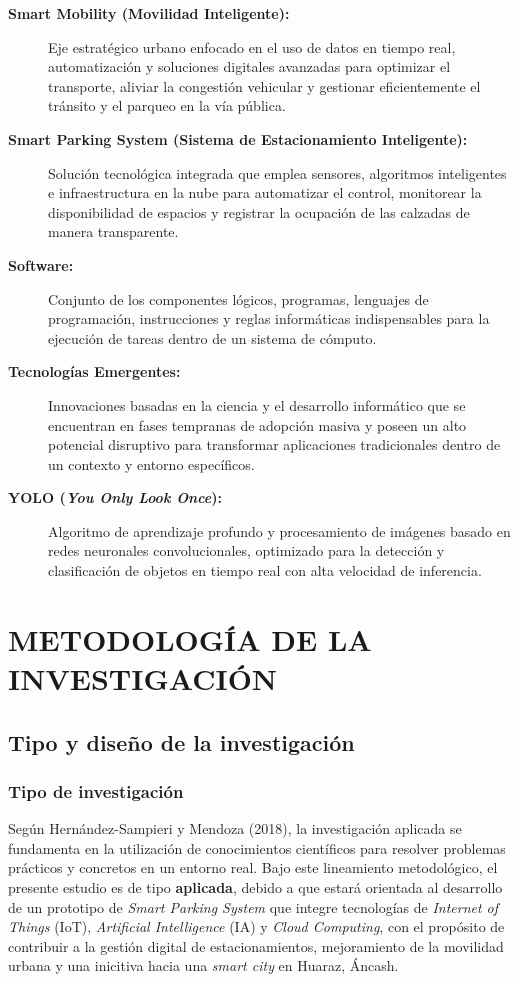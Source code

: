 \documentclass[12pt,a4paper]{article}
\begin{document}
\begin{description}
	\item[\textbf{Smart Mobility (Movilidad Inteligente):}] Eje estratégico urbano enfocado en el uso de datos en tiempo real, automatización y soluciones digitales avanzadas para optimizar el transporte, aliviar la congestión vehicular y gestionar eficientemente el tránsito y el parqueo en la vía pública.
	
	\item[\textbf{Smart Parking System (Sistema de Estacionamiento Inteligente):}] Solución tecnológica integrada que emplea sensores, algoritmos inteligentes e infraestructura en la nube para automatizar el control, monitorear la disponibilidad de espacios y registrar la ocupación de las calzadas de manera transparente.
	
	\item[\textbf{Software:}] Conjunto de los componentes lógicos, programas, lenguajes de programación, instrucciones y reglas informáticas indispensables para la ejecución de tareas dentro de un sistema de cómputo.
	
	\item[\textbf{Tecnologías Emergentes:}] Innovaciones basadas en la ciencia y el desarrollo informático que se encuentran en fases tempranas de adopción masiva y poseen un alto potencial disruptivo para transformar aplicaciones tradicionales dentro de un contexto y entorno específicos.
	
	\item[\textbf{YOLO (\textit{You Only Look Once}):}] Algoritmo de aprendizaje profundo y procesamiento de imágenes basado en redes neuronales convolucionales, optimizado para la detección y clasificación de objetos en tiempo real con alta velocidad de inferencia.
\end{description}


\clearpage
\section{METODOLOGÍA DE LA INVESTIGACIÓN}

\subsection{Tipo y diseño de la investigación}

\subsubsection{Tipo de investigación}
Según Hernández-Sampieri y Mendoza (2018), la investigación aplicada se fundamenta en la utilización de conocimientos científicos para resolver problemas prácticos y concretos en un entorno real. Bajo este lineamiento metodológico, el presente estudio es de tipo \textbf{aplicada}, debido a que estará orientada al desarrollo de un prototipo de \textit{Smart Parking System} que integre tecnologías de \textit{Internet of Things} (IoT), \textit{Artificial Intelligence} (IA) y \textit{Cloud Computing}, con el propósito de contribuir a la gestión digital de estacionamientos, mejoramiento de la movilidad urbana y una inicitiva hacia una \textit{smart city} en Huaraz, Áncash.
\end{document}
